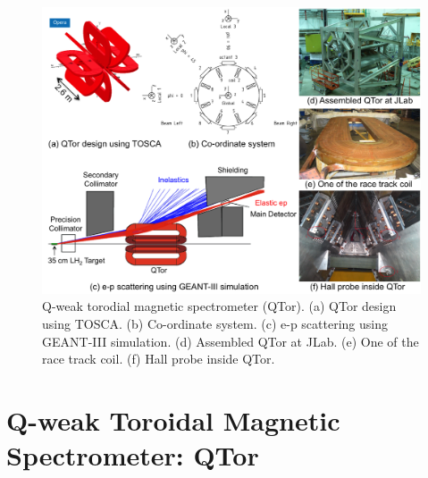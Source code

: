 \begin{singlespace}
\begin{figure}[!h]
	\begin{center}
	\includegraphics[width=15cm]{figures/QTor}
	\caption
	{Q-weak torodial magnetic spectrometer (QTor). (a) QTor design using TOSCA. (b) Co-ordinate system. (c) e-p scattering using GEANT-III simulation. (d) Assembled QTor at JLab. (e) One of the race track coil. (f) Hall probe inside QTor. }
	\label{fig:QTor}
	\end{center}
\end{figure}
\end{singlespace}



\section{Q-weak Toroidal Magnetic Spectrometer: QTor}%
\label{QTor}


